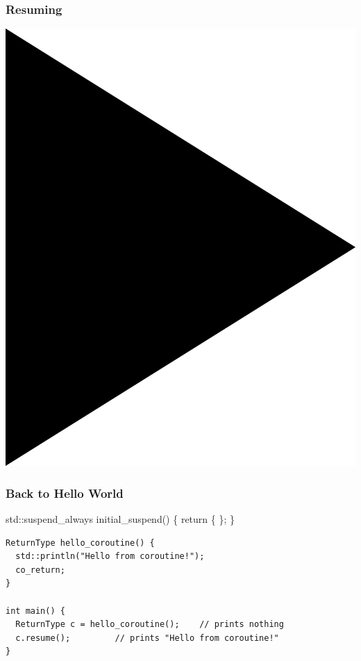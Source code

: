 \documentclass[aspectratio=169]{beamer}
\begin{document}
\begin{frame}

  \frametitle{Resuming}
  
  \begin{center}
  \includegraphics[height=.75\textheight]{corogfx/icon_play.png}
  \end{center}

\end{frame}

\begin{frame}[fragile]

  \frametitle{Back to Hello World}


  \begin{semiverbatim}
\alert<1>{std::suspend_always} initial_suspend() \{ return \{ \}; \}
  \end{semiverbatim}

  \begin{lstlisting}[style=cpp20]
ReturnType hello_coroutine() {
  std::println("Hello from coroutine!");
  co_return;
}

int main() {
  ReturnType c = hello_coroutine();    // prints nothing
  c.resume();         // prints "Hello from coroutine!"
}
\end{lstlisting}

\end{frame}
\end{document}

